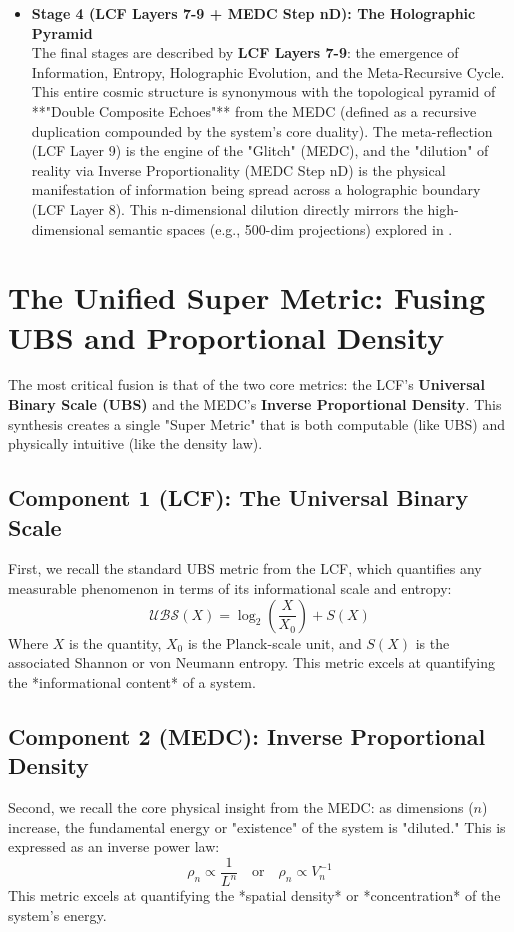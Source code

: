 \documentclass[11pt, a4paper]{article}
\begin{document}
\begin{itemize}
			\item \textbf{Stage 4 (LCF Layers 7-9 + MEDC Step nD): The Holographic Pyramid}\\
			The final stages are described by \textbf{LCF Layers 7-9}: the emergence of Information, Entropy, Holographic Evolution, and the Meta-Recursive Cycle. This entire cosmic structure is synonymous with the topological pyramid of **"Double Composite Echoes"** from the MEDC (defined as a recursive duplication compounded by the system's core duality). The meta-reflection (LCF Layer 9) is the engine of the "Glitch" (MEDC), and the "dilution" of reality via Inverse Proportionality (MEDC Step nD) is the physical manifestation of information being spread across a holographic boundary (LCF Layer 8). This n-dimensional dilution directly mirrors the high-dimensional semantic spaces (e.g., 500-dim projections) explored in \cite{BUSS}.
		\end{itemize}
		
		
		
		\section{The Unified Super Metric: Fusing UBS and Proportional Density}
		
		The most critical fusion is that of the two core metrics: the LCF's \textbf{Universal Binary Scale (UBS)} and the MEDC's \textbf{Inverse Proportional Density}. This synthesis creates a single "Super Metric" that is both computable (like UBS) and physically intuitive (like the density law).
		
		\subsection{Component 1 (LCF): The Universal Binary Scale}
		First, we recall the standard UBS metric from the LCF, which quantifies any measurable phenomenon in terms of its informational scale and entropy:
		\[
		\mathcal{UBS}(X) = \log_2 \left( \frac{X}{X_0} \right) + S(X)
		\]
		Where \(X\) is the quantity, \(X_0\) is the Planck-scale unit, and \(S(X)\) is the associated Shannon or von Neumann entropy. This metric excels at quantifying the *informational content* of a system.
		
		\subsection{Component 2 (MEDC): Inverse Proportional Density}
		Second, we recall the core physical insight from the MEDC: as dimensions ($n$) increase, the fundamental energy or "existence" of the system is "diluted." This is expressed as an inverse power law:
		\[
		\rho_n \propto \frac{1}{L^n} \quad \text{or} \quad \rho_n \propto V_n^{-1}
		\]
		This metric excels at quantifying the *spatial density* or *concentration* of the system's energy.
		
\end{document}
